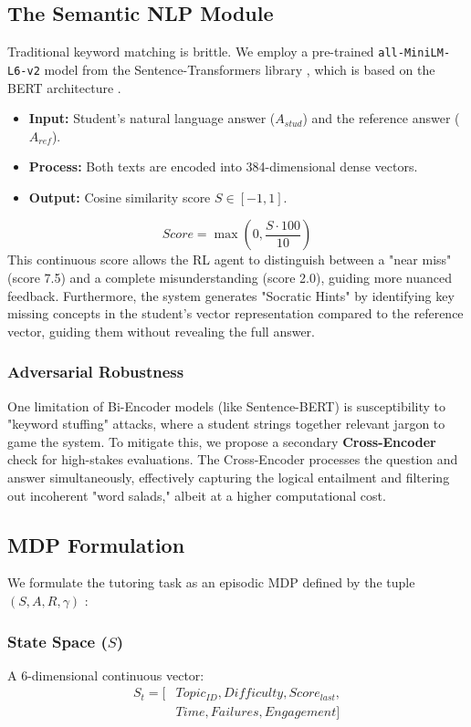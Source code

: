 \documentclass[conference]{IEEEtran}
\begin{document}
\subsection{The Semantic NLP Module}
Traditional keyword matching is brittle. We employ a pre-trained \texttt{all-MiniLM-L6-v2} model from the Sentence-Transformers library \cite{reimers2019}, which is based on the BERT architecture \cite{devlin2019}.
\begin{itemize}
    \item \textbf{Input:} Student's natural language answer ($A_{stud}$) and the reference answer ($A_{ref}$).
    \item \textbf{Process:} Both texts are encoded into 384-dimensional dense vectors.
    \item \textbf{Output:} Cosine similarity score $S \in [-1, 1]$.
\end{itemize}
\begin{equation}
Score = \max(0, \frac{S \cdot 100}{10})
\end{equation}
This continuous score allows the RL agent to distinguish between a "near miss" (score 7.5) and a complete misunderstanding (score 2.0), guiding more nuanced feedback. Furthermore, the system generates "Socratic Hints" by identifying key missing concepts in the student's vector representation compared to the reference vector, guiding them without revealing the full answer.

\subsubsection{Adversarial Robustness}
One limitation of Bi-Encoder models (like Sentence-BERT) is susceptibility to "keyword stuffing" attacks, where a student strings together relevant jargon to game the system. To mitigate this, we propose a secondary \textbf{Cross-Encoder} check for high-stakes evaluations. The Cross-Encoder processes the question and answer simultaneously, effectively capturing the logical entailment and filtering out incoherent "word salads," albeit at a higher computational cost.

\subsection{MDP Formulation}
We formulate the tutoring task as an episodic MDP defined by the tuple $(S, A, R, \gamma)$ \cite{sutton2018}:

\subsubsection{State Space ($S$)}
A 6-dimensional continuous vector:
\begin{equation}
\begin{aligned}
S_t = [&Topic_{ID}, Difficulty, Score_{last}, \\
      &Time, Failures, Engagement]
\end{aligned}
\end{equation}
\end{document}
